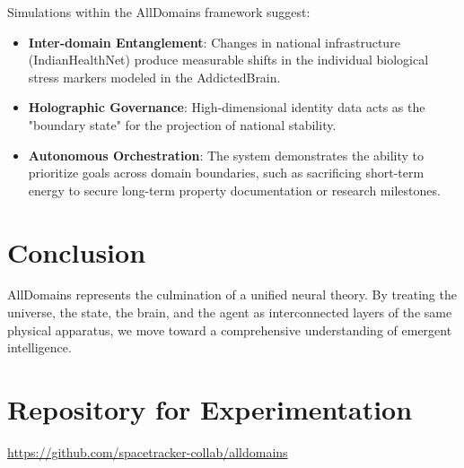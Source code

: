 \documentclass[12pt]{article}
\begin{document}
Simulations within the AllDomains framework suggest:
\begin{itemize}
\item \textbf{Inter-domain Entanglement}: Changes in national infrastructure (IndianHealthNet) produce measurable shifts in the individual biological stress markers modeled in the AddictedBrain.
\item \textbf{Holographic Governance}: High-dimensional identity data acts as the "boundary state" for the projection of national stability.
\item \textbf{Autonomous Orchestration}: The system demonstrates the ability to prioritize goals across domain boundaries, such as sacrificing short-term energy to secure long-term property documentation or research milestones.
\end{itemize}

\section{Conclusion}
AllDomains represents the culmination of a unified neural theory. By treating the universe, the state, the brain, and the agent as interconnected layers of the same physical apparatus, we move toward a comprehensive understanding of emergent intelligence.

\section{Repository for Experimentation}
\noindent
\url{https://github.com/spacetracker-collab/alldomains}
\end{document}
